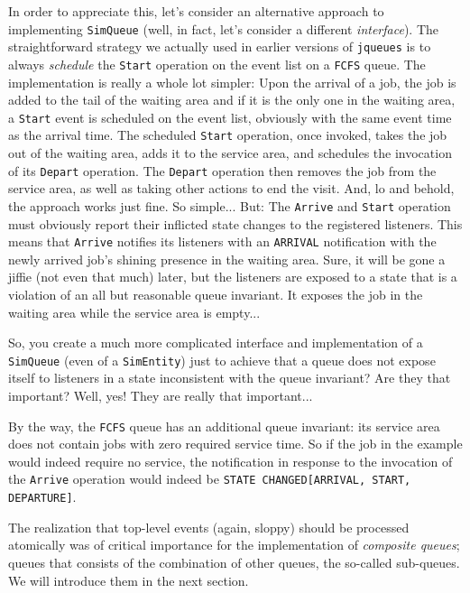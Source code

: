 \documentclass[12pt]{book}
\begin{document}
In order to appreciate this,
  let's consider an alternative approach to implementing \lstinline|SimQueue|
  (well, in fact, let's consider a different {\em interface\/}).
The straightforward strategy we actually used in earlier versions
  of \lstinline|jqueues| is to always {\em schedule\/}
  the \lstinline|Start| operation on the event list
  on a \lstinline|FCFS| queue.
The implementation is really a whole lot simpler:
  Upon the arrival of a job,
  the job is added to the tail of the waiting area
  and if it is the only one in the waiting area,
  a \lstinline|Start| event is scheduled on the event list,
  obviously with the same event time as the arrival time.
The scheduled \lstinline|Start| operation,
  once invoked,
  takes the job out of the waiting area,
  adds it to the service area,
  and schedules the invocation of
  its \lstinline|Depart| operation.
The \lstinline|Depart| operation then
  removes the job from the service area,
  as well as taking other actions to
  end the visit.
And, lo and behold,
  the approach works just fine.
So simple...
But: The \lstinline|Arrive| and \lstinline|Start|
  operation must obviously report
  their inflicted state changes to the registered listeners.
This means that
  \lstinline|Arrive| notifies its listeners with an \lstinline|ARRIVAL|
  notification with the newly arrived job's
  shining presence in the waiting area.
Sure,
  it will be gone a jiffie (not even that much) later,
  but the listeners are exposed to a state
  that is a violation of an all but reasonable
  queue invariant.
It exposes the job in the waiting area while
  the service area is empty...

So, you create a much more complicated interface and
  implementation of a \lstinline|SimQueue|
  (even of a \lstinline|SimEntity|)
  just to achieve that
  a queue does not expose itself to listeners
  in a state inconsistent with the queue invariant?
Are they that important?
Well, yes! They are really that important...

By the way,
  the \lstinline|FCFS| queue has an additional queue invariant:
  its service area does not contain jobs with zero
  required service time.
So if the job in the example would indeed require no
  service, the notification in response to
  the invocation of the \lstinline|Arrive| operation
  would indeed be \lstinline|STATE CHANGED[ARRIVAL, START, DEPARTURE]|.

The realization that top-level events (again, sloppy) should
  be processed atomically was of critical importance
  for the implementation of {\em composite queues\/};
  queues that consists of the combination of other
  queues, the so-called sub-queues.
We will introduce them in the next section.
\end{document}
